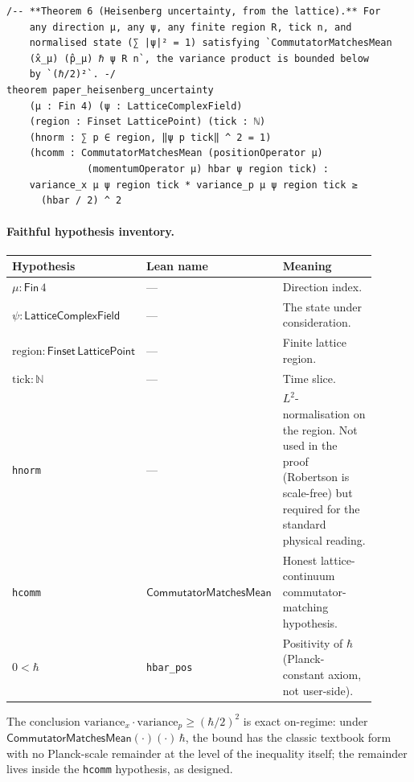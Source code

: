 \documentclass[11pt,a4paper,twoside]{article}
\theoremstyle{definition}
\newcommand{\Nbb}{\mathbb{N}}
\newcommand{\CMM}{\mathsf{CommutatorMatchesMean}}
\newcommand{\Lfield}{\mathsf{LatticeComplexField}}
\newcommand{\code}[1]{\texttt{#1}}
\begin{document}
\begin{lstlisting}
/-- **Theorem 6 (Heisenberg uncertainty, from the lattice).** For
    any direction μ, any ψ, any finite region R, tick n, and
    normalised state (∑ |ψ|² = 1) satisfying `CommutatorMatchesMean
    (x̂_μ) (p̂_μ) ℏ ψ R n`, the variance product is bounded below
    by `(ℏ/2)²`. -/
theorem paper_heisenberg_uncertainty
    (μ : Fin 4) (ψ : LatticeComplexField)
    (region : Finset LatticePoint) (tick : ℕ)
    (hnorm : ∑ p ∈ region, ‖ψ p tick‖ ^ 2 = 1)
    (hcomm : CommutatorMatchesMean (positionOperator μ)
              (momentumOperator μ) hbar ψ region tick) :
    variance_x μ ψ region tick * variance_p μ ψ region tick ≥
      (hbar / 2) ^ 2
\end{lstlisting}

\paragraph{Faithful hypothesis inventory.}

\begin{longtable}{@{}p{0.22\linewidth} p{0.26\linewidth} p{0.42\linewidth}@{}}
\toprule
Hypothesis & Lean name & Meaning \\
\midrule
\endhead
$\mu:\mathsf{Fin}\,4$ & --- & Direction index. \\
$\psi:\Lfield$ & --- & The state under consideration. \\
$\mathrm{region}:\mathsf{Finset}\,\mathsf{LatticePoint}$ & --- & Finite lattice region. \\
$\mathrm{tick}:\Nbb$ & --- & Time slice. \\
\code{hnorm} & --- & $L^{2}$-normalisation on the region. Not used in the proof (Robertson is scale-free) but required for the standard physical reading. \\
\code{hcomm} & $\CMM$ & Honest lattice-continuum commutator-matching hypothesis. \\
$0<\hbar$ & \code{hbar\_pos} & Positivity of $\hbar$ (Planck-constant axiom, not user-side). \\
\bottomrule
\end{longtable}

\noindent The conclusion
$\mathrm{variance}_{x}\cdot\mathrm{variance}_{p}\ge(\hbar/2)^{2}$ is
exact on-regime: under $\CMM(\cdot)(\cdot)\,\hbar$, the bound has the
classic textbook form with no Planck-scale remainder at the level of
the inequality itself; the remainder lives inside the \code{hcomm}
hypothesis, as designed.
\end{document}
